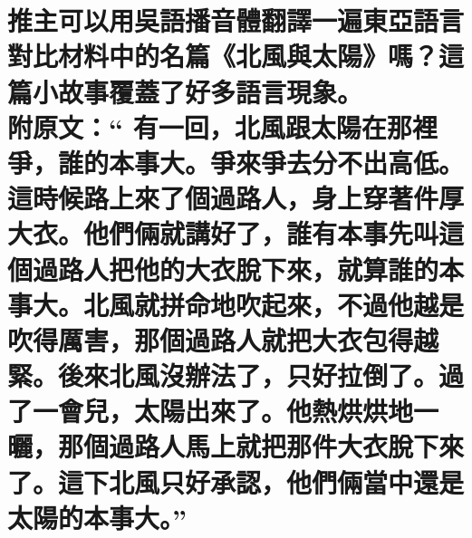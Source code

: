 %
% 

\chapter[推主可以用吳語播音體翻譯一遍東亞語言對比材料中的名篇《北風與太陽》嗎？這篇小故事覆蓋了好多語言現象。 附原文：“ 有一回，北風跟太陽在那裡爭，誰的本事大。爭來爭去分不出高低。這時候路上來了個過路人，身上穿著件厚大衣。他們倆就講好了，誰有本事先叫這個過路人把他的大衣脫下來，就算誰的本事大。北風就拼命地吹起來，不過他越是吹得厲害，那個過路人就把大衣包得越緊。後來北風沒辦法了，只好拉倒了。過了一會兒，太陽出來了。他熱烘烘地一曬，那個過路人馬上就把那件大衣脫下來了。這下北風只好承認，他們倆當中還是太陽的本事大。”]{推主可以用吳語播音體翻譯一遍東亞語言對比材料中的名篇《北風與太陽》嗎？這篇小故事覆蓋了好多語言現象。 \\[0.35em] 附原文：“ 有一回，北風跟太陽在那裡爭，誰的本事大。爭來爭去分不出高低。這時候路上來了個過路人，身上穿著件厚大衣。他們倆就講好了，誰有本事先叫這個過路人把他的大衣脫下來，就算誰的本事大。北風就拼命地吹起來，不過他越是吹得厲害，那個過路人就把大衣包得越緊。後來北風沒辦法了，只好拉倒了。過了一會兒，太陽出來了。他熱烘烘地一曬，那個過路人馬上就把那件大衣脫下來了。這下北風只好承認，他們倆當中還是太陽的本事大。”}

